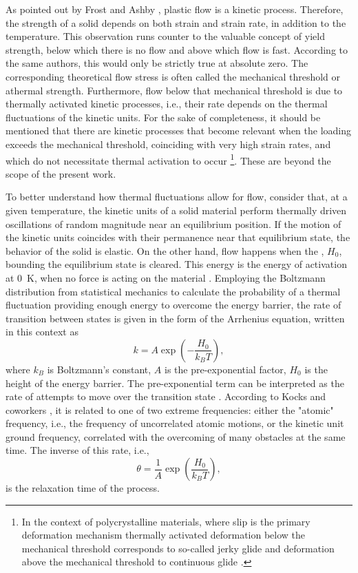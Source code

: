As pointed out by Frost and Ashby \citep{frostDeformationmechanismMapsPlasticity1982}, plastic flow is a kinetic process.
Therefore, the strength of a solid depends on both strain and strain rate, in addition to the temperature.
This observation runs counter to the valuable concept of yield strength, below which there is no flow and above which flow is fast.
According to the same authors, this would only be strictly true at absolute zero.
The corresponding theoretical flow stress is often called the mechanical threshold or athermal strength.
Furthermore, flow below that mechanical threshold is due to thermally activated kinetic processes, i.e., their rate depends on the thermal fluctuations of the kinetic units.
For the sake of completeness, it should be mentioned that there are kinetic processes that become relevant when the loading exceeds the mechanical threshold, coinciding with very high strain rates, and which do not necessitate thermal activation to occur \citep{kocks1975thermodynamics}\footnote{In the context of polycrystalline materials, where slip is the primary deformation mechanism thermally activated deformation below the mechanical threshold corresponds to so-called jerky glide and deformation above the mechanical threshold to continuous glide \citep{kocks1975thermodynamics}.}.
These are beyond the scope of the present work.

To better understand how thermal fluctuations allow for flow, consider that, at a given temperature, the kinetic units of a solid material perform thermally driven oscillations of random magnitude near an equilibrium position.
If the motion of the kinetic units coincides with their permanence near that equilibrium state, the behavior of the solid is elastic.
On the other hand, flow happens when the , $H_0$, bounding the equilibrium state is cleared.
This energy is the energy of activation at \SI{0}{\kelvin}, when no force is acting on the material \citep{kocks1975thermodynamics}.
Employing the Boltzmann distribution from statistical mechanics to calculate the probability of a thermal fluctuation providing enough energy to overcome the energy barrier, the rate of transition between states is given in the form of the Arrhenius equation, written in this context as
\begin{equation}
	k = A\exp\left(-\frac{H_0}{k_BT}\right),
\end{equation}
where $k_B$ is Boltzmann's constant, $A$ is the pre-exponential factor, $H_0$ is the height of the energy barrier.
The pre-exponential term can be interpreted as the rate of attempts to move over the transition state \citep{atkins2010atkins}.
According to Kocks and coworkers \citep{kocks1975thermodynamics}, it is related to one of two extreme frequencies: either the "atomic" frequency, i.e., the frequency of uncorrelated atomic motions, or the kinetic unit ground frequency, correlated with the overcoming of many obstacles at the same time.
The inverse of this rate, i.e.,
\begin{equation}
	\theta = \frac{1}{A}\exp\left(\frac{H_0}{k_B T}\right),
\end{equation}
is the relaxation time of the process.

